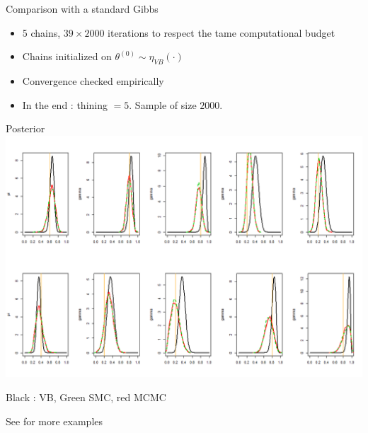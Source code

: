 \begin{frame}{Comparison with a standard Gibbs}

\begin{itemize}
\item 5 chains, $39\times 2000$ iterations to respect the tame  computational budget
\item Chains initialized on  $\theta^{(0)} \sim \eta_{VB}(\cdot)$
\item Convergence checked empirically
\item In the end : thining $=5$.  Sample of size $2000$. 
\end{itemize}
 
\end{frame}



\begin{frame}{Posterior}
\centering
 \includegraphics[width= \textwidth]{figures/post_example.png}
 
 Black : VB, Green SMC, red  MCMC
 
 See \cite{donnet2017using} for more examples
\end{frame}


